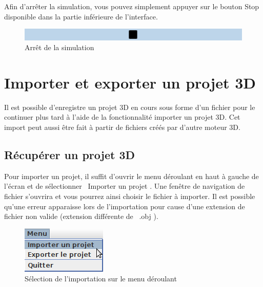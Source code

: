 \documentclass[11pt]{report}
\begin{document}
Afin d'arrêter la simulation, vous pouvez simplement appuyer sur le bouton Stop disponible dans la partie inférieure de l'interface.

\begin{figure}[h]
  \centering
  \includegraphics[width=16cm]{./btn_stop.png}
  \caption{Arrêt de la simulation}
\end{figure}

\chapter{Importer et exporter un projet 3D}

Il est possible d'enregistre un projet 3D en cours sous forme d'un fichier pour le continuer plus tard à l'aide de
la fonctionnalité importer un projet 3D. Cet import peut aussi être fait à partir de fichiers créés par d'autre moteur 3D.

\section{Récupérer un projet 3D}

Pour importer un projet, il suffit d'ouvrir le menu déroulant en haut à gauche de l'écran et de sélectionner \flqq\ Importer un projet \frqq.
Une fenêtre de navigation de fichier s'ouvrira et vous pourrez ainsi choisir le fichier à importer.
Il est possible qu'une erreur apparaisse lors de l'importation pour cause d'une extension de fichier non valide (extension différente de \flqq\ .obj \frqq).

\begin{figure}[h]
  \centering
  \includegraphics{./menu_imp.png}
  \caption{Sélection de l'importation sur le menu déroulant}
\end{figure}
\end{document}
